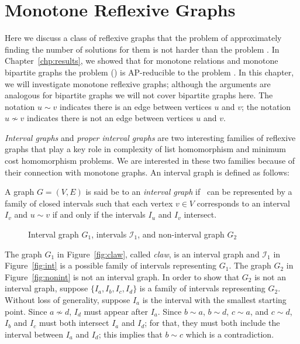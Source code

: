 \chapter{Monotone Reflexive Graphs}
Here we discuss a class of reflexive graphs that the problem of approximately finding the
number of solutions for them is not harder than the problem \cbis\@.
In Chapter~\ref{chp:results}, we showed that for monotone relations and monotone
bipartite graphs the problem \ccsp(\mH) is AP-reducible to the problem \cbis\@. In this chapter,
we will investigate monotone reflexive graphs; although the arguments are
analogous for bipartite graphs we will not cover bipartite graphs here.
The notation \(u \sim v\) indicates there is an edge between vertices \(u\) and \(v\);
the notation \(u \not \sim v\) indicates there is not an edge between vertices \(u\) and \(v\)\@.

\emph{Interval graphs} and \emph{proper interval graphs}
are two interesting families of reflexive graphs that play a key role in complexity of 
list homomorphism and minimum cost homomorphism problems. We are interested in these two families
because of their connection with monotone graphs. 
An interval graph is defined as follows:

\begin{defi}
A graph \(G=(V,E)\) is said be to an \emph{interval graph} if \mG\ can
be represented by a family of closed intervals such that
each vertex \(v \in V\) corresponds to an interval \(I_v\) and \(u \sim v\)
if and only if the intervals \(I_u\) and \(I_v\) intersect.
\end{defi}

\begin{figure} [h]
\center
\subfigure[\ensuremath{G_1}]{\label{fig:claw}} \hspace{2cm}
\subfigure[\ensuremath{I_1}]{\label{fig:int}} \hspace{2cm}
\subfigure[\ensuremath{G_2}]{\label{fig:nonint}}
\caption{Interval graph \ensuremath{G_1}, intervals \ensuremath{\mathcal{I}_1}, and non-interval graph \ensuremath{G_2}}
\end{figure}

The graph \(G_1\) in Figure~\ref{fig:claw}, called \emph{claw}, is an interval graph
and \(\mathcal{I}_1\) in Figure~\ref{fig:int} is a possible family of intervals representing \(G_1\)\@.
The graph \(G_2\) in Figure~\ref{fig:nonint} is not an interval graph. In order to show that \(G_2\) is not
an interval graph, suppose \(\{I_a, I_b, I_c, I_d\}\) is a family of intervals representing \(G_2\)\@.
Without loss of generality, suppose \(I_a\) is the interval with the smallest starting point.
Since \(a\not \sim d\), \(I_d\) must appear after \(I_a\)\@. Since \(b\sim a\), \(b\sim d\), \(c\sim a\), and \(c\sim d\),
\(I_b\) and \(I_c\) must both intersect \(I_a\) and \(I_d\); for that, they must both include the interval between
\(I_a\) and \(I_d\); this implies that \(b\sim c\) which is a contradiction.

